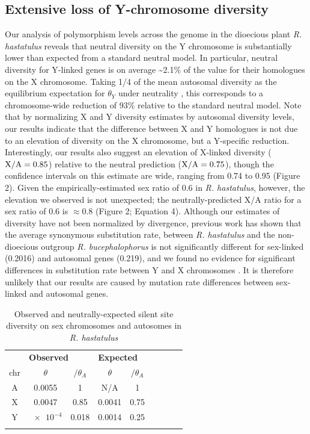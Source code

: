 \documentclass[9pt,twocolumn,twoside]{gsajnl}
\begin{document}
\subsection*{Extensive loss of Y-chromosome diversity}
Our analysis of polymorphism levels across the genome in the dioecious plant \textit{R. hastatulus} reveals that neutral diversity on the Y chromosome is substantially lower than expected from a standard neutral model. In particular, neutral diversity for Y-linked genes is on average \textasciitilde 2.1\% of the value for their homologues on the X chromosome. Taking 1/4 of the mean autosomal diversity as the equilibrium expectation for $\theta_{Y}$ under neutrality \citep{wright1931evolution}, this corresponds to a chromosome-wide reduction of 93\% relative to the standard neutral model. Note that by normalizing X and Y diversity estimates by autosomal diversity levels, our results indicate that the difference between X and Y homologues is not due to an elevation of diversity on the X chromosome, but a Y-specific reduction. Interestingly, our results also suggest an elevation of X-linked diversity ($\textnormal{X/A}=0.85$) relative to the neutral prediction ($\textnormal{X/A}=0.75$), though the confidence intervals on this estimate are wide, ranging from 0.74 to 0.95 (Figure 2). Given the empirically-estimated sex ratio of 0.6 in \textit{R. hastatulus}\citep{pickup2013influence}, however, the elevation we observed is not unexpected; the neutrally-predicted X/A ratio for a sex ratio of 0.6 is $\approx 0.8$ (Figure 2; Equation 4). Although our estimates of diversity have not been normalized by divergence, previous work has shown that the average synonymous substitution rate, between \textit{R. hastatulus} and the non-dioecious outgroup \textit{R. bucephalophorus} is not significantly different for sex-linked (0.2016) and autosomal genes (0.219), and we found no evidence for significant differences in substitution rate between Y and X chromosomes \citep{hough2014}. It is therefore unlikely that our results are caused by mutation rate differences between sex-linked and autosomal genes.

\begin{table}[htb]
\centering
\caption{Observed and neutrally-expected silent site diversity on sex chromosomes and autosomes in \textit{R. hastatulus}}
\begin{tabular}{ccccccccc}
\textbf{} & \multicolumn{2}{l}{\textbf{Observed}} & \multicolumn{3}{l}{\textbf{Expected}} \\

chr & $\theta$ & $/\theta_{A}$ & $\theta$ & $/\theta_{A}$  \\
\midrule
A & 0.0055 & 1 & N/A & 1 \\
X & 0.0047 & 0.85 & 0.0041 & 0.75 \\
Y & $\num{e-4}$ & 0.018 & 0.0014 & 0.25 \\
\addlinespace

\bottomrule
\end{tabular}
\end{table}
\end{document}
